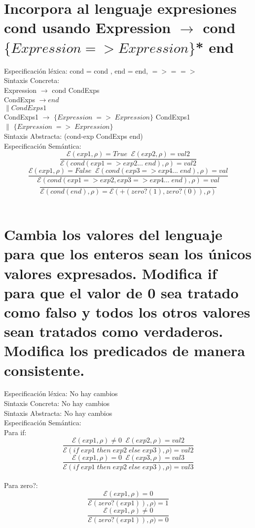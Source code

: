 \documentclass{article}
\begin{document}
\section{Incorpora al lenguaje expresiones cond usando Expression $\rightarrow$ cond $\{Expression => Expression\}$* end}
Especificación léxica:
cond = cond , end = end, $=>$ = $=>$
\\
Sintaxis Concreta:
\\
Expression $\rightarrow$ cond CondExps
\\
CondExps $\rightarrow end$
\\
$\|CondExps1$
\\
CondExps1 $\rightarrow$ $\{Expression\; => \;Expression\}$ CondExps1
\\
$\|$ $\{Expression\; => \;Expression\}$ 
\\
Sintaxis Abstracta:
(cond-exp CondExps end)
\\
Especificación Semántica:
$$\frac{\mathcal{E} (exp1,\rho) = True \;\; \mathcal{E}(exp2,\rho)= val2}{\mathcal{E} (cond(exp1 => exp2...\; end), \rho) = val2}$$
$$\frac{\mathcal{E} (exp1,\rho) = False \;\; \mathcal{E}(cond(exp3 => exp4...\; end),\rho)= val}{\mathcal{E} (cond(exp1 => exp2, exp3 => exp4...\; end), \rho) = val}$$
$$\frac{}{\mathcal{E} (cond(end), \rho) = \mathcal{E}(+(zero?(1), zero?(0)),\rho)}$$
\\

\section{Cambia los valores del lenguaje para que los enteros sean los únicos valores expresados.
Modifica if para que el valor de 0 sea tratado como falso y todos los otros valores sean
tratados como verdaderos. Modifica los predicados de manera consistente.}
Especificación léxica:
No hay cambios
\\
Sintaxis Concreta:
No hay cambios
\\
Sintaxis Abstracta:
No hay cambios
\\
Especificación Semántica:
\\
Para if:
$$\frac{\mathcal{E} (exp1,\rho) \neq 0 \;\; \mathcal{E}(exp2,\rho)= val2}{\mathcal{E} (if\; exp1\; then \; exp2 \; else \; exp3), \rho) = val2}$$
$$\frac{\mathcal{E} (exp1,\rho) = 0 \;\; \mathcal{E}(exp3,\rho)= val3}{\mathcal{E} (if\; exp1\; then \; exp2 \; else \; exp3), \rho) = val3}$$
\\
Para zero?:
$$\frac{\mathcal{E} (exp1,\rho) = 0}{\mathcal{E} (zero?(exp1)), \rho) = 1}$$
$$\frac{\mathcal{E} (exp1,\rho) \neq 0}{\mathcal{E} (zero?(exp1)), \rho) = 0}$$
\\
\end{document}
